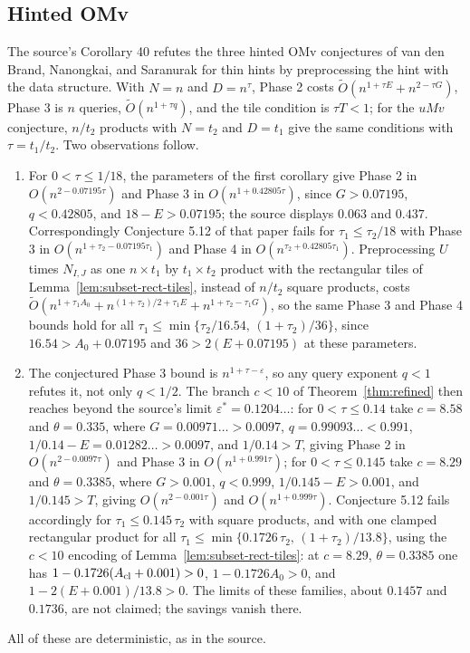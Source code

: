 \documentclass[11pt]{article}
\newcommand{\softO}{\widetilde O}
\begin{document}
\subsection*{Hinted OMv}
The source's Corollary 40 refutes the three hinted OMv conjectures of
van den Brand, Nanongkai, and Saranurak for thin hints by preprocessing the
hint with the data structure. With $N=n$ and $D=n^\tau$, Phase 2 costs
$\softO(n^{1+\tau E}+n^{2-\tau G})$, Phase 3 is $n$ queries,
$\softO(n^{1+\tau q})$, and the tile condition is $\tau T<1$; for the
$uMv$ conjecture, $n/t_2$ products with $N=t_2$ and $D=t_1$ give the same
conditions with $\tau=t_1/t_2$. Two observations follow.
\begin{enumerate}
\item For $0<\tau\le1/18$, the parameters of the first corollary give
Phase 2 in $O(n^{2-0.07195\tau})$ and Phase 3 in $O(n^{1+0.42805\tau})$,
since $G>0.07195$, $q<0.42805$, and $18-E>0.07195$; the source displays
$0.063$ and $0.437$. Correspondingly Conjecture 5.12 of that paper fails for
$\tau_1\le\tau_2/18$ with Phase 3 in $O(n^{1+\tau_2-0.07195\tau_1})$ and
Phase 4 in $O(n^{\tau_2+0.42805\tau_1})$. Preprocessing $U$ times $N_{I,J}$ as
one $n\times t_1$ by $t_1\times t_2$ product with the rectangular tiles of
Lemma~\ref{lem:subset-rect-tiles}, instead of $n/t_2$ square products,
costs $\softO(n^{1+\tau_1A_0}+n^{(1+\tau_2)/2+\tau_1E}+n^{1+\tau_2-\tau_1G})$,
so the same Phase 3 and Phase 4 bounds hold for all
$\tau_1\le\min\{\tau_2/16.54,\,(1+\tau_2)/36\}$, since
$16.54>A_0+0.07195$ and $36>2(E+0.07195)$ at these parameters.
\item The conjectured Phase 3 bound is $n^{1+\tau-\varepsilon}$, so any
query exponent $q<1$ refutes it, not only $q<1/2$. The branch $c<10$ of
Theorem~\ref{thm:refined} then reaches beyond the source's limit
$\varepsilon^*=0.1204\ldots$: for $0<\tau\le0.14$ take $c=8.58$ and
$\theta=0.335$, where $G=0.00971\ldots>0.0097$, $q=0.99093\ldots<0.991$,
$1/0.14-E=0.01282\ldots>0.0097$, and $1/0.14>T$, giving Phase 2 in
$O(n^{2-0.0097\tau})$ and Phase 3 in $O(n^{1+0.991\tau})$; for
$0<\tau\le0.145$ take $c=8.29$ and $\theta=0.3385$, where $G>0.001$,
$q<0.999$, $1/0.145-E>0.001$, and $1/0.145>T$, giving $O(n^{2-0.001\tau})$
and $O(n^{1+0.999\tau})$. Conjecture 5.12 fails accordingly for
$\tau_1\le0.145\,\tau_2$ with square products, and with one clamped
rectangular product for all $\tau_1\le\min\{0.1726\,\tau_2,\,(1+\tau_2)/13.8\}$,
using the $c<10$ encoding of Lemma~\ref{lem:subset-rect-tiles}: at
$c=8.29$, $\theta=0.3385$ one has $1-0.1726(A_{\rm cl}+0.001)>0$,
$1-0.1726A_0>0$, and $1-2(E+0.001)/13.8>0$. The limits of these families,
about $0.1457$ and $0.1736$, are not claimed; the savings vanish there.
\end{enumerate}
All of these are deterministic, as in the source.
\end{document}
